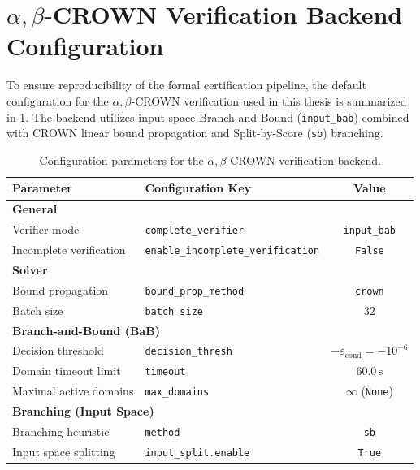 \section{\texorpdfstring{$\alpha,\beta$}{α,β}-CROWN Verification Backend Configuration}
\label{app:abcrown-config}
To ensure reproducibility of the formal certification pipeline, the default configuration for the $\alpha,\beta$-CROWN verification 
used in this thesis is summarized in \cref{tab:app-abcrown-config}. 
The backend utilizes input-space Branch-and-Bound (\texttt{input\_bab}) combined with CROWN linear bound propagation and 
Split-by-Score (\texttt{sb}) branching.

\begin{table}[htbp]
    \centering
    \small
    \caption{Configuration parameters for the $\alpha,\beta$-CROWN verification backend.}
    \label{tab:app-abcrown-config}
    \begin{tabular}{llc}
        \toprule
        \textbf{Parameter} & \textbf{Configuration Key} & \textbf{Value} \\
        \midrule
        \multicolumn{3}{l}{\textbf{General}} \\
        \midrule
        Verifier mode & \texttt{complete\_verifier} & \texttt{input\_bab} \\
        Incomplete verification & \texttt{enable\_incomplete\_verification} & \texttt{False} \\
        \midrule
        \multicolumn{3}{l}{\textbf{Solver}} \\
        \midrule
        Bound propagation & \texttt{bound\_prop\_method} & \texttt{crown} \\
        Batch size & \texttt{batch\_size} & $32$ \\
        \midrule
        \multicolumn{3}{l}{\textbf{Branch-and-Bound (BaB)}} \\
        \midrule
        Decision threshold & \texttt{decision\_thresh} & $-\varepsilon_{\mathrm{cond}} = -10^{-6}$ \\
        Domain timeout limit & \texttt{timeout} & $60.0\,\mathrm{s}$ \\
        Maximal active domains & \texttt{max\_domains} & $\infty$ (\texttt{None}) \\
        \midrule
        \multicolumn{3}{l}{\textbf{Branching (Input Space)}} \\
        Branching heuristic & \texttt{method} & \texttt{sb} \\
        Input space splitting & \texttt{input\_split.enable} & \texttt{True} \\

\end{tabular}
\end{table}
